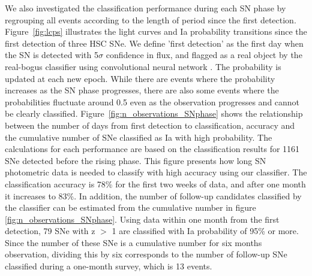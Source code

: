 \documentclass[useamsfonts]{pasj01}
\begin{document}
We also investigated the classification performance during each SN phase by regrouping all events according to the length of period since the first detection.
Figure\ \ref{fig:lcps} illustrates the light curves and Ia probability transitions since the first detection of three HSC SNe.
We define 'first detection' as the first day when the SN is detected with 5$\sigma$ confidence in flux, and flagged as a real object by the real-bogus classifier using convolutional neural network \citep{yasuda19a}.
The probability is updated at each new epoch.
While there are events where the probability increases as the SN phase progresses, there are also some events where the probabilities fluctuate around 0.5 even as the observation progresses and cannot be clearly classified.
Figure\ \ref{fig:n_observations_SNphase} shows the relationship between the number of days from first detection to classification, accuracy and the cumulative number of SNe classified as Ia with high probability.
The calculations for each performance are based on the classification results for 1161 SNe detected before the rising phase.
This figure presents how long SN photometric data is needed to classify with high accuracy using our classifier.
The classification accuracy is 78\% for the first two weeks of data, and after one month it increases to 83\%.
In addition, the number of follow-up candidates classified by the classifier can be estimated from the cumulative number in figure \ref{fig:n_observations_SNphase}.
Using data within one month from the first detection, 79 SNe with z $>$ 1 are classified with Ia probability of 95\% or more.
Since the number of these SNe is a cumulative number for six months observation, dividing this by six corresponds to the number of follow-up SNe classified during a one-month survey, which is 13 events.
\end{document}
